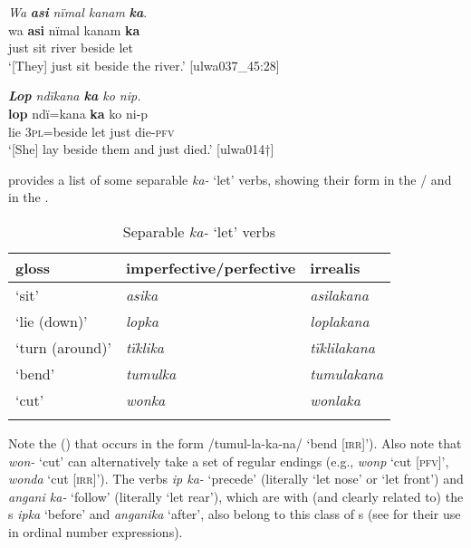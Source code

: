 \ea%
    \label{ex:phrase:95}
          \textit{Wa} \textbf{\textit{asi}} \textit{nïmal kanam} \textbf{\textit{ka}}.\\
\gll wa  \textbf{asi}  nïmal  kanam  \textbf{ka}\\
    just  sit  river  beside  let\\
\glt `[They] just sit beside the river.’ [ulwa037\_45:28]
\z


\ea%
    \label{ex:phrase:96}
          \textit{\textbf{Lop} ndïkana \textbf{ka} ko nip.}\\
\gll    \textbf{lop}  ndï=kana    \textbf{ka}  ko  ni-p\\
    lie  3\textsc{pl}=beside  let  just  die-\textsc{pfv}\\
\glt `[She] lay beside them and just died.’ [ulwa014†]
\z

 provides a list of some separable \textit{ka-} ‘let’ verbs, showing their form in the / and in the .


\begin{table}
\caption{Separable \textit{ka-} ‘let’ verbs}
\label{tab:9.3}
\begin{tabularx}{\textwidth}{QQQ}
\lsptoprule
gloss & imperfective/perfective & irrealis\\
\midrule
‘sit’ & {\itshape asika} & {\itshape asilakana}\\
‘lie (down)’ & {\itshape lopka} & {\itshape loplakana}\\
‘turn (around)’ & {\itshape tïklika} & {\itshape tïklilakana}\\
‘bend’ & {\itshape tumulka} & {\itshape tumulakana}\\
‘cut’ & {\itshape wonka} & {\itshape wonlaka}\\
\lspbottomrule
\end{tabularx}
\end{table}


Note the  () that occurs in the  form /tumul-la-ka-na/ ‘bend [\textsc{irr}]’). Also note that \textit{won-} ‘cut’ can alternatively take a set of regular  endings (e.g., \textit{wonp} ‘cut [\textsc{pfv}]’, \textit{wonda} ‘cut [\textsc{irr}]’). The  verbs \textit{ip ka-} ‘precede’ (literally ‘let nose’ or ‘let front’) and \textit{angani ka-} ‘follow’ (literally ‘let rear’), which are  with (and clearly related to) the s \textit{ipka} ‘before’ and \textit{anganika} ‘after’, also belong to this class of s (see  for their use in  ordinal number expressions).

